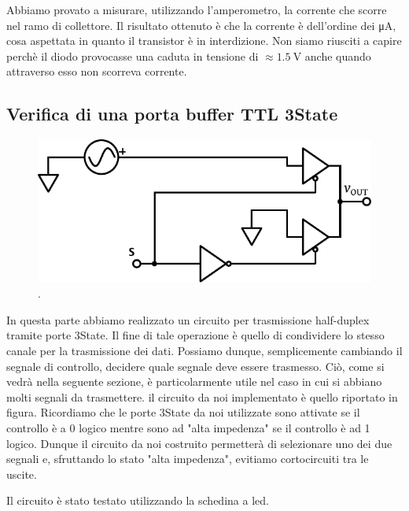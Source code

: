 Abbiamo provato a misurare, utilizzando l'amperometro, la corrente che scorre nel ramo di collettore. Il risultato ottenuto è che la corrente è dell'ordine dei \si{\micro\ampere}, cosa aspettata  in quanto il transistor è in interdizione. Non siamo riusciti a capire perchè il diodo provocasse una caduta in tensione di $\approx \SI{1.5}{\volt}$ anche quando attraverso esso non scorreva corrente. 


\subsection{Verifica di una porta buffer TTL 3State}

\begin{figure}
\centering
\includegraphics[width=.35\textwidth]{../E10/latex/impedence.pdf}
\caption{.}
\label{cir10:3state}
\end{figure}

In questa parte abbiamo realizzato un circuito per trasmissione half-duplex tramite porte 3State. Il fine di tale operazione è quello di condividere lo stesso canale per la trasmissione dei dati. Possiamo dunque, semplicemente cambiando il segnale di controllo, decidere quale segnale deve essere trasmesso. Ciò, come si vedrà nella seguente sezione, è particolarmente utile nel caso in cui si abbiano molti segnali da trasmettere. il circuito da noi implementato è quello riportato in figura. Ricordiamo che le porte 3State da noi utilizzate sono attivate se il controllo è a 0 logico mentre sono ad "alta impedenza" se il controllo è ad 1 logico. Dunque il circuito da noi costruito permetterà di selezionare uno dei due segnali e, sfruttando lo stato "alta impedenza", evitiamo cortocircuiti tra le uscite. 

Il circuito è stato testato utilizzando la schedina a led.
